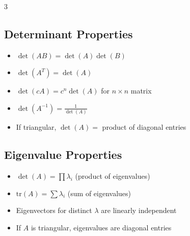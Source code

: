 \documentclass[10pt,landscape]{article}
\begin{document}
\begin{multicols*}{3}
\subsection*{Determinant Properties}
\begin{itemize}
    \item $\det(AB) = \det(A)\det(B)$
    \item $\det(A^T) = \det(A)$
    \item $\det(cA) = c^n\det(A)$ for $n \times n$ matrix
    \item $\det(A^{-1}) = \frac{1}{\det(A)}$
    \item If triangular, $\det(A) =$ product of diagonal entries
\end{itemize}

\subsection*{Eigenvalue Properties}
\begin{itemize}
    \item $\det(A) = \prod \lambda_i$ (product of eigenvalues)
    \item $\text{tr}(A) = \sum \lambda_i$ (sum of eigenvalues)
    \item Eigenvectors for distinct $\lambda$ are linearly independent
    \item If $A$ is triangular, eigenvalues are diagonal entries
\end{itemize}

\end{multicols*}
\end{document}
